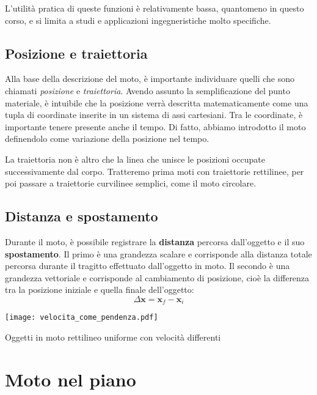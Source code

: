 L'utilità pratica di queste funzioni è relativamente bassa, quantomeno
in questo corso, e si limita a studi e applicazioni ingegneristiche
molto specifiche.












\newpage


\subsection*{Posizione e traiettoria}
Alla base della descrizione del moto, è importante individuare quelli che sono
chiamati \textit{posizione} e \textit{traiettoria}. Avendo assunto la semplificazione
del punto materiale, è intuibile che la posizione verrà descritta matematicamente
come una tupla di coordinate inserite in un sistema di assi cartesiani. Tra le
coordinate, è importante tenere presente anche il tempo. Di fatto, abbiamo
introdotto il moto definendolo come variazione della posizione nel tempo.

La traiettoria non è altro che la linea che unisce le posizioni occupate
successivamente dal corpo. Tratteremo prima moti con traiettorie rettilinee,
per poi passare a traiettorie curvilinee semplici, come il moto circolare.


\subsection*{Distanza e spostamento}
Durante il moto, è possibile registrare la \textbf{distanza} percorsa
dall'oggetto e il suo \textbf{spostamento}. Il primo è una grandezza
scalare e corrisponde alla distanza totale percorsa durante il tragitto
effettuato dall'oggetto in moto. Il secondo è una grandezza vettoriale e
corrisponde al cambiamento di posizione,
cioè la differenza tra la posizione iniziale e quella finale dell'oggetto:
\[ \Delta \mathbf{x} = \mathbf{x}_f - \mathbf{x}_i \]


\begin{marginfigure}
    \centering
    \texttt{[image: velocita\_come\_pendenza.pdf]}
    \caption{Oggetti in moto rettilineo uniforme con velocità differenti}
\end{marginfigure}


\section*{Moto nel piano}

